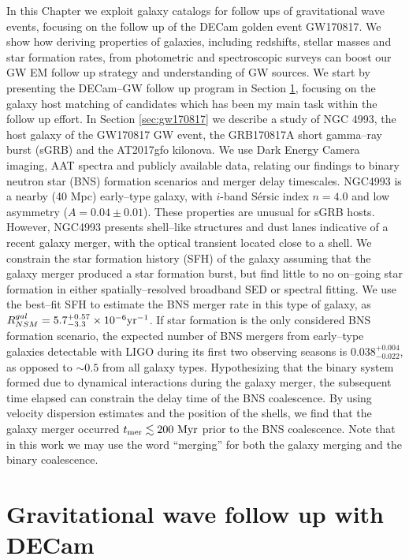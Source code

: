 In this Chapter we exploit galaxy catalogs for follow ups of gravitational wave events, focusing on the follow up of the DECam golden event GW170817. We show how deriving properties of galaxies, including redshifts, stellar masses and star formation rates, from photometric and spectroscopic surveys can boost our GW EM follow up strategy and understanding of GW sources. We start by presenting the DECam--GW follow up program in Section \ref{sec:desgw}, focusing on the galaxy host matching of candidates which has been my main task within the follow up effort. In Section \ref{sec:gw170817} we describe a study of NGC 4993, the host galaxy of the GW170817 GW event, the GRB170817A short gamma--ray burst (sGRB) and the AT2017gfo kilonova. We use Dark Energy Camera imaging, AAT spectra and publicly available data, relating our findings to binary neutron star (BNS) formation scenarios and merger delay timescales. NGC4993 is a nearby (40 Mpc) early--type galaxy, with $i$-band S\'ersic index $n=4.0$ and low asymmetry ($A=0.04\pm 0.01$). These properties are unusual for sGRB hosts. However, NGC4993 presents shell--like structures and dust lanes indicative of a recent galaxy merger, with the optical transient located close to a shell. We constrain the star formation history (SFH) of the galaxy assuming that the galaxy merger produced a star formation burst, but find little to no on--going star formation in either spatially--resolved broadband SED or spectral fitting. We use the best--fit SFH to estimate the BNS merger rate in this type of galaxy, as $R_{NSM}^{gal}= 5.7^{+0.57}_{-3.3} \times 10^{-6} {\rm yr}^{-1}$. If star formation is the only considered BNS formation scenario, the expected number of BNS mergers from early--type galaxies detectable with LIGO during its first two observing seasons is $0.038^{+0.004}_{-0.022}$, as opposed to $\sim 0.5$ from all galaxy types. Hypothesizing that the binary system formed due to dynamical interactions during the galaxy merger, the subsequent time elapsed can constrain the delay time of the BNS coalescence. By using velocity dispersion estimates and the position of the shells, we find that the galaxy merger occurred $t_{\rm mer}\lesssim 200~{\rm Myr}$ prior to the BNS coalescence. 
Note that in this work we may use the word ``merging'' for both the galaxy merging and the binary coalescence.


\section{Gravitational wave follow up with DECam}\label{sec:desgw}


